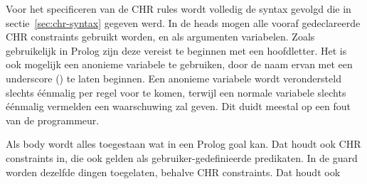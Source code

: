 Voor het specificeren van de CHR rules wordt volledig de syntax gevolgd die in sectie~\ref{sec:chr-syntax} gegeven werd. In de heads mogen alle vooraf gedeclareerde CHR constraints gebruikt worden, en als argumenten variabelen. Zoals gebruikelijk in Prolog zijn deze vereist te beginnen met een hoofdletter. Het is ook mogelijk een anonieme variabele te gebruiken, door de naam ervan met een underscore (\code{\_}) te laten beginnen. Een anonieme variabele wordt verondersteld slechts \'e\'enmalig per regel voor te komen, terwijl een normale variabele slechts \'e\'enmalig vermelden een waarschuwing zal geven. Dit duidt meestal op een fout van de programmeur.

Als body wordt alles toegestaan wat in een Prolog goal kan. Dat houdt ook CHR constraints in, die ook gelden als gebruiker-gedefinieerde predikaten. In de guard worden dezelfde dingen toegelaten, behalve CHR constraints. Dat houdt ook 

